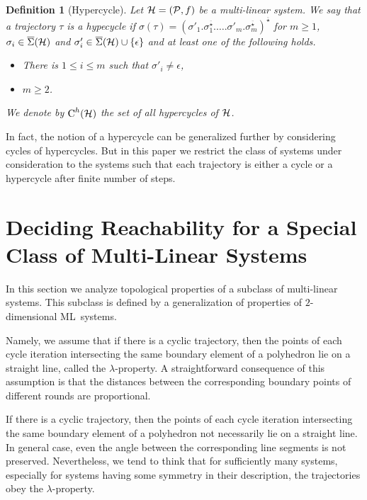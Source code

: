 \documentclass[copyright,creativecommons]{packages/eptcs}
\newcommand{\ml}{\mbox{ML}}
\newcommand{\traj}{\tau}
\newcommand{\Cycle}{\mbox{C}}
\newcommand{\seq}{\overline{\star}}
\newcommand{\sgn}{\Sigma}
\newcommand{\ssgn}{\overline{\sgn}}
\newcommand{\Hc}{\Cycle^h}
\newtheorem{definition}[theorem]{Definition}
\begin{document}
\begin{definition}[Hypercycle] Let ${\cal{H}}=({\cal P},f)$ be a multi-linear system.
We say that a trajectory $\traj$  is a hypecycle  if $\sigma(\tau)=(\sigma'_1.\sigma^{\seq}_1.\dots .\sigma'_m.\sigma^{\seq}_m)^{\seq}$ for $m\geq 1$, $\sigma_i\in\ssgn(\cal H)$  and $\sigma_i'\in\ssgn(\cal H)\cup\{\epsilon\}$ and at least one of the following holds.
\begin{itemize}
 \item There is $1\leq i\leq m$ such that $\sigma'_i\neq \epsilon$,
\item $m\geq 2$.
\end{itemize}

We denote by $\Hc(\cal H)$ the set of all hypercycles of $\cal H$.
\end{definition}

In fact, the notion of a hypercycle can be generalized further by considering cycles of hypercycles. But in this paper we restrict the class of systems under consideration to the systems such that each trajectory is either a cycle or a hypercycle after finite number of steps. 




\section{Deciding Reachability for a Special Class of Multi-Linear Systems }\label{sec:reachability}

In this section we analyze topological properties of a subclass of multi-linear systems. This subclass is defined by a generalization of properties of $2$-dimensional \ml~systems. 

 Namely, we assume  that if there is a cyclic trajectory, then  the points of each cycle iteration intersecting the same boundary element of a polyhedron lie on a straight line, called the $\lambda$-property. A straightforward consequence of this assumption is that the distances between the corresponding boundary points of different rounds are proportional. 

If there is a cyclic trajectory, then  the points of each cycle iteration intersecting the same boundary element of a polyhedron not necessarily lie on a straight line. In general case, even the angle  between the corresponding line segments is not preserved. Nevertheless, we tend to think that for sufficiently many systems, especially for systems having some symmetry in their description,   the trajectories obey the $\lambda$-property. 
\end{document}
